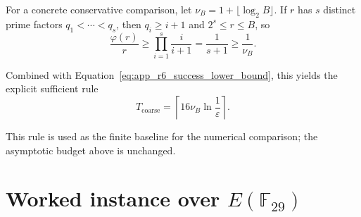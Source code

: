 \begin{revision}
For a concrete conservative comparison, let $\nu_B=1+\lfloor\log_2B\rfloor$. If $r$ has $s$ distinct prime factors $q_1<\cdots<q_s$, then $q_i\geq i+1$ and $2^s\leq r\leq B$, so 
\[
    \frac{\varphi(r)}{r}\geq\prod_{i=1}^s\frac{i}{i+1}
    =\frac{1}{s+1}\geq\frac{1}{\nu_B}.
\]

Combined with Equation~\eqref{eq:app_r6_success_lower_bound}, this yields the explicit sufficient rule 
\[
    T_{\mathrm{coarse}}=
    \left\lceil16\nu_B\ln\frac{1}{\varepsilon}\right\rceil.
\]

This rule is used as the finite baseline for the numerical comparison; the asymptotic budget above is unchanged.
\end{revision}

\section{Worked instance over \texorpdfstring{$E(\mathbb{F}_{29})$}{E(F29)}}\label{app:instance}

